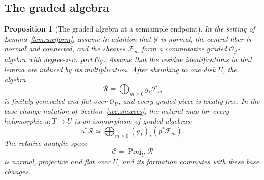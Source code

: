 \documentclass[11pt,a4paper]{article}
\numberwithin{equation}{section}
\newtheorem{proposition}[theorem]{Proposition}
\theoremstyle{definition}
\theoremstyle{remark}
\newcommand{\OO}{\mathcal O}\newcommand{\cX}{\mathcal X}
\begin{document}
\subsection{The graded algebra}

\begin{proposition}[The graded algebra at a semiample endpoint]
\label{prop:endpoint-graded-algebra}
In the setting of Lemma~\ref{lem:uniform}, assume in addition that
$\mathcal Y$ is normal, the central fiber is normal and connected,
and the sheaves $\mathcal F_m$ form a commutative graded
$\OO_{\mathcal Y}$-algebra with degree-zero part $\OO_{\mathcal Y}$.
Assume that the residue identifications in that lemma are induced by
its multiplication. After shrinking to one disk $U$, the algebra
\[
 \mathcal R=\bigoplus_{m\ge0}g_*\mathcal F_m
\]
is finitely generated and flat over $\OO_U$, and every graded piece
is locally free. In the base-change notation of
Section~\ref{sec:sheaves}, the natural map for every holomorphic
$u:T\to U$ is an isomorphism of graded algebras:
\begin{equation}\label{eq:graded-holomorphic-base-change}
 u^*\mathcal R\simeq
 \bigoplus_{m\ge0}(g_T)_*(p^*\mathcal F_m).
\end{equation}
The relative analytic space
\[
 \mathcal C=\operatorname{Proj}_U\mathcal R
\]
is normal, projective and flat over $U$, and its formation commutes
with these base changes.
\end{proposition}
\end{document}
